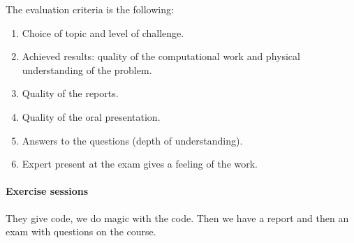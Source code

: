 \documentclass[palatino]{epflnotes}
\begin{document}
The evaluation criteria is the following:

\begin{enumerate}
\item Choice of topic and level of challenge.
\item Achieved results: quality of the computational work and physical understanding of the problem.
\item Quality of the reports.
\item Quality of the oral presentation.
\item Answers to the questions (depth of understanding).
\item Expert present at the exam gives a feeling of the work.
\end{enumerate}

\paragraph{Exercise sessions} They give code, we do magic with the code. Then we have a report and then an exam with questions on the course.

%

\backmatter
\printindex
\end{document}
